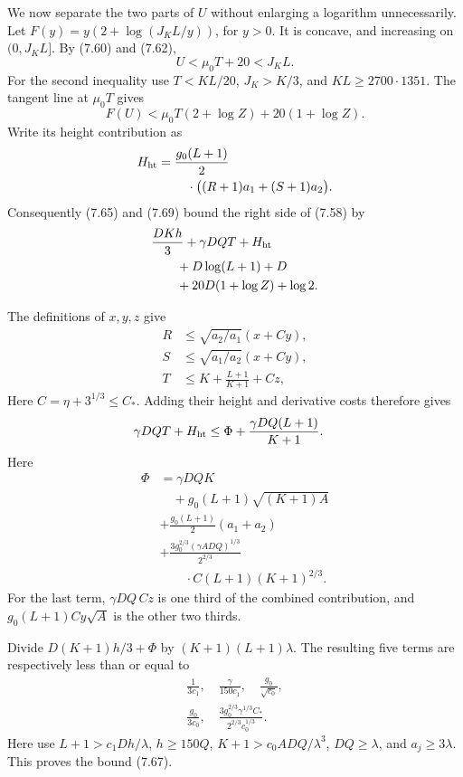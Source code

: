 \documentclass[
  11pt,
  a4paper,
]{article}
\begin{document}
We now separate the two parts of \(U\) without enlarging a logarithm
unnecessarily. Let \(F(y)=y(2+\log(J_KL/y))\), for \(y>0\). It is
concave, and increasing on \((0,J_KL]\). By (7.60) and (7.62), \[
U<\mu_0T+20<J_KL.
\] For the second inequality use \(T<KL/20\), \(J_K>K/3\), and
\(KL\ge2700\cdot1351\). The tangent line at \(\mu_0T\) gives \[
F(U)<\mu_0T(2+\log Z)+20(1+\log Z).
\] Write its height contribution as \[
\begin{aligned}
H_{\rm ht}={}&\frac{g_0(L+1)}2\\
&\quad\cdot\big((R+1)a_1+(S+1)a_2\big).
\end{aligned}
\] Consequently (7.65) and (7.69) bound the right side of (7.58) by \[
\begin{aligned}
&\frac{DKh}{3}+\gamma DQT+H_{\rm ht}\\
&\qquad+D\log(L+1)+D\\
&\qquad+20D(1+\log Z)+\log2.
\end{aligned}
\]

The definitions of \(x,y,z\) give \[
\begin{aligned}
R&\le\sqrt{a_2/a_1}(x+Cy),\\
S&\le\sqrt{a_1/a_2}(x+Cy),\\
T&\le K+\frac{L+1}{K+1}+Cz,
\end{aligned}
\] Here \(C=\eta+3^{1/3}\le C_*\). Adding their height and derivative
costs therefore gives \[
\begin{aligned}
\gamma DQT+H_{\rm ht}
&\le\Phi+\frac{\gamma DQ(L+1)}{K+1}.
\end{aligned}
\] Here \[
\begin{aligned}
\Phi&=\gamma DQK\\
&\quad+g_0(L+1)\sqrt{(K+1)A}\\
&+\frac{g_0(L+1)}2(a_1+a_2)\\
&+\frac{3g_0^{2/3}(\gamma ADQ)^{1/3}}{2^{2/3}}
\\
&\qquad\cdot C(L+1)(K+1)^{2/3}.
\end{aligned} \tag{7.70}
\] For the last term, \(\gamma DQ\,Cz\) is one third of the combined
contribution, and \(g_0(L+1)Cy\sqrt A\) is the other two thirds.

Divide \(D(K+1)h/3+\Phi\) by \((K+1)(L+1)\lambda\). The resulting five
terms are respectively less than or equal to \[
\begin{gathered}
\frac1{3c_1},\quad \frac\gamma{150c_1},\quad
\frac{g_0}{\sqrt{c_0}},\\
\frac{g_0}{3c_0},\quad
\frac{3g_0^{2/3}\gamma^{1/3}C_*}{2^{2/3}c_0^{1/3}}.
\end{gathered}
\] Here use \(L+1>c_1Dh/\lambda\), \(h\ge150Q\),
\(K+1>c_0ADQ/\lambda^3\), \(DQ\ge\lambda\), and \(a_j\ge3\lambda\). This
proves the bound (7.67).
\end{document}
